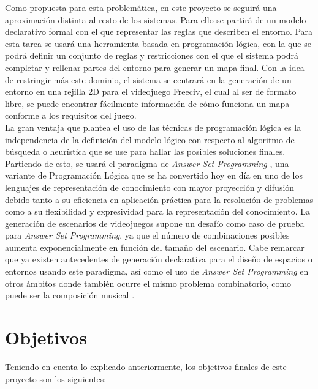 Como propuesta para esta problemática, en este proyecto se seguirá una aproximación distinta al resto de los sistemas. Para ello se partirá de un modelo declarativo formal con el que representar las reglas que describen el entorno. Para esta tarea se usará una herramienta basada en programación lógica, con la que se podrá definir un conjunto de reglas y restricciones con el que el sistema podrá completar y rellenar partes del entorno para generar un mapa final. Con la idea de restringir más este dominio, el sistema se centrará en la generación de un entorno en una rejilla 2D para el videojuego Freeciv, el cual al ser de formato libre, se puede encontrar fácilmente información de cómo funciona un mapa conforme a los requisitos del juego. \\

La gran ventaja que plantea el uso de las técnicas de programación lógica es la independencia de la definición del modelo lógico con respecto al algoritmo de búsqueda o heurística que se use para hallar las posibles soluciones finales. Partiendo de esto, se usará el paradigma de \textit{Answer Set Programming} \cite{asp}, una variante de Programación Lógica que se ha convertido hoy en día en uno de los lenguajes de representación de conocimiento con mayor proyección y difusión debido tanto a su eficiencia en aplicación práctica para la resolución de problemas como a su flexibilidad y expresividad para la representación del conocimiento. La generación de escenarios de videojuegos supone un desafío como caso de prueba para \textit{Answer Set Programming}, ya que el número de combinaciones posibles aumenta exponencialmente en función del tamaño del escenario. Cabe remarcar que ya existen antecedentes de generación declarativa para el diseño de espacios o entornos \cite{desing} usando este paradigma, así como el uso de \textit{Answer Set Programming} en otros ámbitos donde también ocurre el mismo problema combinatorio, como puede ser la composición musical \cite{haspie} \cite{DBLP:journals/corr/abs-1006-4948}.

\section{Objetivos}

Teniendo en cuenta lo explicado anteriormente, los objetivos finales de este proyecto son los siguientes:

